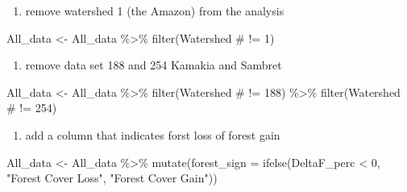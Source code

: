\documentclass[]{elsarticle} %
\newenvironment{Shaded}{\begin{snugshade}}{\end{snugshade}}
\newcommand{\AttributeTok}[1]{\textcolor[rgb]{0.77,0.63,0.00}{#1}}
\newcommand{\DecValTok}[1]{\textcolor[rgb]{0.00,0.00,0.81}{#1}}
\newcommand{\FunctionTok}[1]{\textcolor[rgb]{0.00,0.00,0.00}{#1}}
\newcommand{\NormalTok}[1]{#1}
\newcommand{\OtherTok}[1]{\textcolor[rgb]{0.56,0.35,0.01}{#1}}
\newcommand{\SpecialCharTok}[1]{\textcolor[rgb]{0.00,0.00,0.00}{#1}}
\newcommand{\StringTok}[1]{\textcolor[rgb]{0.31,0.60,0.02}{#1}}
\providecommand{\tightlist}{%
  \setlength{\itemsep}{0pt}\setlength{\parskip}{0pt}}
\begin{document}
\begin{enumerate}
\def\labelenumi{\arabic{enumi}.}
\setcounter{enumi}{2}
\tightlist
\item
  remove watershed 1 (the Amazon) from the analysis
\end{enumerate}

\begin{Shaded}
\begin{Highlighting}[]
\NormalTok{All\_data }\OtherTok{\textless{}{-}}\NormalTok{ All\_data }\SpecialCharTok{\%\textgreater{}\%}
  \FunctionTok{filter}\NormalTok{(}\StringTok{\textasciigrave{}}\AttributeTok{Watershed \#}\StringTok{\textasciigrave{}} \SpecialCharTok{!=} \DecValTok{1}\NormalTok{)}
\end{Highlighting}
\end{Shaded}

\begin{enumerate}
\def\labelenumi{\arabic{enumi}.}
\setcounter{enumi}{3}
\tightlist
\item
  remove data set 188 and 254 Kamakia and Sambret
\end{enumerate}

\begin{Shaded}
\begin{Highlighting}[]
\NormalTok{All\_data }\OtherTok{\textless{}{-}}\NormalTok{ All\_data }\SpecialCharTok{\%\textgreater{}\%}
  \FunctionTok{filter}\NormalTok{(}\StringTok{\textasciigrave{}}\AttributeTok{Watershed \#}\StringTok{\textasciigrave{}} \SpecialCharTok{!=} \DecValTok{188}\NormalTok{) }\SpecialCharTok{\%\textgreater{}\%}
  \FunctionTok{filter}\NormalTok{(}\StringTok{\textasciigrave{}}\AttributeTok{Watershed \#}\StringTok{\textasciigrave{}} \SpecialCharTok{!=} \DecValTok{254}\NormalTok{)}
\end{Highlighting}
\end{Shaded}

\begin{enumerate}
\def\labelenumi{\arabic{enumi}.}
\setcounter{enumi}{4}
\tightlist
\item
  add a column that indicates forst loss of forest gain
\end{enumerate}

\begin{Shaded}
\begin{Highlighting}[]
\NormalTok{All\_data }\OtherTok{\textless{}{-}}\NormalTok{ All\_data }\SpecialCharTok{\%\textgreater{}\%}
  \FunctionTok{mutate}\NormalTok{(}\AttributeTok{forest\_sign =} \FunctionTok{ifelse}\NormalTok{(DeltaF\_perc }\SpecialCharTok{\textless{}} \DecValTok{0}\NormalTok{, }\StringTok{"Forest Cover Loss"}\NormalTok{, }\StringTok{"Forest Cover Gain"}\NormalTok{))}
\end{Highlighting}
\end{Shaded}
\end{document}
